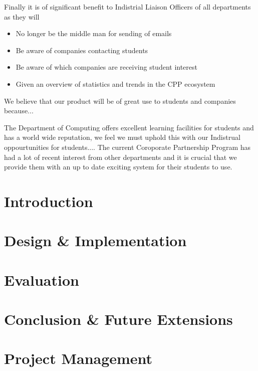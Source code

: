 \documentclass{article}
\begin{document}
Finally it is of significant benefit to Indistrial Liaison Officers of all departments as they will

\begin{itemize}
  \item No longer be the middle man for sending of emails
  \item Be aware of companies contacting students
  \item Be aware of which companies are receiving student interest
  \item Given an overview of statistics and trends in the CPP ecosystem
\end{itemize}

We believe that our product will be of great use to students and companies because...

The Department of Computing offers excellent learning facilities for students and has a world wide reputation, we feel we must uphold this with our Indistrual oppourtunities for students....
The current Coroporate Partnership Program has had a lot of recent interest from other departments and it is crucial that we provide them with an up to date exciting system for their students to use.





\section{Introduction}
\section{Design \& Implementation}
\section{Evaluation}
\section{Conclusion \& Future Extensions}
\section{Project Management}
\end{document}
